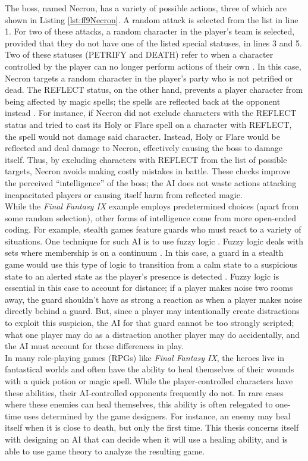 The boss, named Necron, has a variety of possible actions, three of which are shown in Listing \ref{lst:ff9Necron}. A random attack is selected from the list in line 1. For two of these attacks, a random character in the player's team is selected, provided that they do not have one of the listed special statuses, in lines 3 and 5. Two of these statuses (PETRIFY and DEATH) refer to when a character controlled by the player can no longer perform actions of their own \cite{ffIX00}. In this case, Necron targets a random character in the player's party who is not petrified or dead. The REFLECT status, on the other hand, prevents a player character from being affected by magic spells; the spells are reflected back at the opponent instead \cite{ffIX00}. For instance, if Necron did not exclude characters with the REFLECT status and tried to cast its Holy or Flare spell on a character with REFLECT, the spell would not damage said character. Instead, Holy or Flare would be reflected and deal damage to Necron, effectively causing the boss to damage itself. Thus, by excluding characters with REFLECT from the list of possible targets, Necron avoids making costly mistakes in battle. These checks improve the perceived ``intelligence'' of the boss; the AI does not waste actions attacking incapacitated players or causing itself harm from reflected magic.\\

While the \textit{Final Fantasy IX} example employs predetermined choices (apart from some random selection), other forms of intelligence come from more open-ended coding. For example, stealth games feature guards who must react to a variety of situations. One technique for such AI is to use fuzzy logic \cite{schw04}. Fuzzy logic deals with sets where membership is on a continuum \cite{zade65}. In this case, a guard in a stealth game would use this type of logic to transition from a calm state to a suspicious state to an alerted state as the player's presence is detected \cite{schw04}. Fuzzy logic is essential in this case to account for distance; if a player makes noise two rooms away, the guard shouldn't have as strong a reaction as when a player makes noise directly behind a guard. But, since a player may intentionally create distractions to exploit this suspicion, the AI for that guard cannot be too strongly scripted; what one player may do as a distraction another player may do accidentally, and the AI must account for these differences in play.\\

In many role-playing games (RPGs) like \textit{Final Fantasy IX}, the heroes live in fantastical worlds and often have the ability to heal themselves of their wounds with a quick potion or magic spell. While the player-controlled characters have these abilities, their AI-controlled opponents frequently do not. In rare cases where these enemies can heal themselves, this ability is often relegated to one-time uses determined by the game designers. For instance, an enemy may heal itself when it is close to death, but only the first time. This thesis concerns itself with designing an AI that can decide when it will use a healing ability, and is able to use game theory to analyze the resulting game.